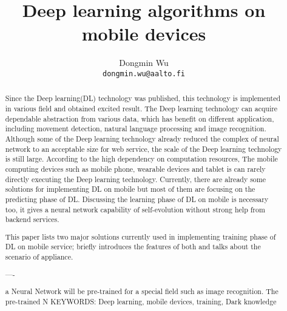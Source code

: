 \documentclass[article]{aaltoseries}
\begin{document}
 

\title{Deep learning algorithms on mobile devices}

\author{Dongmin Wu
\\\textnormal{\texttt{dongmin.wu@aalto.fi}}} %


\maketitle


\begin{abstract}

  Since the Deep learning(DL) technology was published, this technology is
  implemented in various field and obtained excited result. The Deep learning technology can acquire 
  dependable abstraction from various data, which has benefit on different application, 
  including movement detection, natural language processing and image recognition. 
  Although some of the Deep learning technology 
  already reduced the complex of neural network to an acceptable size for web service, the 
 scale of the Deep learning technology is still large. 
 According to the high dependency on computation resources,
 The mobile computing devices such as mobile phone,
  wearable devices and tablet is can rarely directly executing the Deep learning technology. 
 Currently, there are already some solutions for implementing DL on mobile\cite{Ota:2017}
 but most of them are focusing on the predicting phase of DL. 
 Discussing the learning phase of DL on mobile is necessary too, 
 it gives a neural network capability of self-evolution without strong help from backend services.

 This paper lists two major solutions currently used in implementing training phase of DL on mobile service;
 briefly introduces the features of both and talks about the scenario of appliance. 


  ----

 a Neural Network will be pre-trained for a special field such as image recognition. 
 The pre-trained N
\vspace{3mm}
\noindent KEYWORDS: Deep learning, mobile devices, training, Dark knowledge

\end{abstract}
\end{document}
